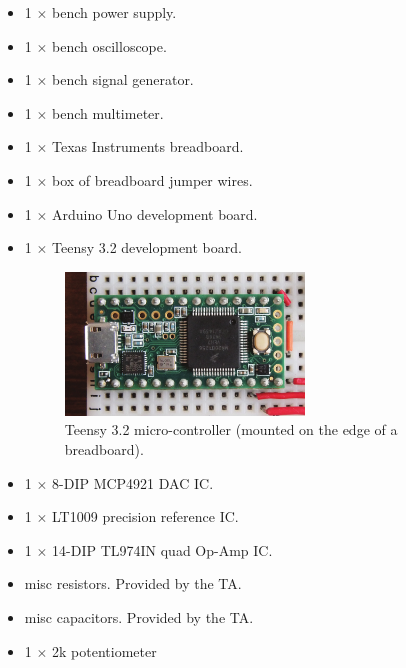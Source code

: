 \documentclass[letterpaper, 11pt]{article}
\begin{document}
\begin{itemize}[itemsep=0.5ex]
\item 1 $\times$ bench power supply.
\item 1 $\times$ bench oscilloscope.
\item 1 $\times$ bench signal generator.
\item 1 $\times$ bench multimeter.
\item 1 $\times$ Texas Instruments breadboard.	
\item 1 $\times$ box of breadboard jumper wires.
\item 1 $\times$ Arduino Uno development board.
\item 1 $\times$ Teensy 3.2 development board.	
	\begin{figure}[h]
		\centering
		\includegraphics[width=2.5in]{teensy-pic}
		\caption{Teensy 3.2 micro-controller (mounted on the edge of a breadboard).}
		\label{fig:teensy}
	\end{figure}
\item 1 $\times$ 8-DIP MCP4921 DAC IC.
\item 1 $\times$ LT1009 precision reference IC.
\item 1 $\times$ 14-DIP TL974IN quad Op-Amp IC.
\item misc resistors. Provided by the TA.
\item misc capacitors. Provided by the TA. 
\item 1 $\times$ 2k potentiometer

\end{itemize}
\end{document}
